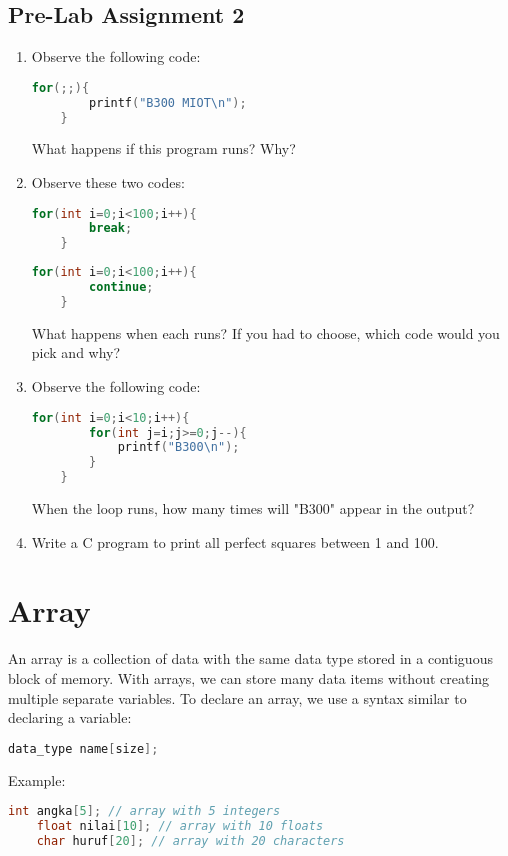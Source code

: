 \subsection*{Pre-Lab Assignment 2}
\begin{enumerate}
	\item Observe the following code:
	\begin{lstlisting}[language=c]
	for(;;){
		printf("B300 MIOT\n");
	}	
\end{lstlisting}
	What happens if this program runs? Why?
	
	\item Observe these two codes:
	\begin{lstlisting}[language=c]
	for(int i=0;i<100;i++){
		break;
	}
\end{lstlisting}
	\begin{lstlisting}[language=c]
	for(int i=0;i<100;i++){
		continue;
	}
\end{lstlisting}
	What happens when each runs?  
	If you had to choose, which code would you pick and why?
	
	\item Observe the following code:
	\begin{lstlisting}[language=c]
	for(int i=0;i<10;i++){
		for(int j=i;j>=0;j--){
			printf("B300\n");
		}
	}
\end{lstlisting}
	When the loop runs, how many times will "B300" appear in the output?
	
	\item Write a C program to print all perfect squares between 1 and 100.
\end{enumerate}

\section{Array}

An array is a collection of data with the same data type stored in a contiguous block of memory.  
With arrays, we can store many data items without creating multiple separate variables.  
To declare an array, we use a syntax similar to declaring a variable:

{
\captionsetup[lstlisting]{labelformat=empty, justification=raggedright, singlelinecheck=false}
\begin{lstlisting}[language=c, caption={Syntax}]
	data_type name[size];
\end{lstlisting}
}
Example:
\begin{lstlisting}[language=c]
	int angka[5]; // array with 5 integers
	float nilai[10]; // array with 10 floats
	char huruf[20]; // array with 20 characters
\end{lstlisting}

